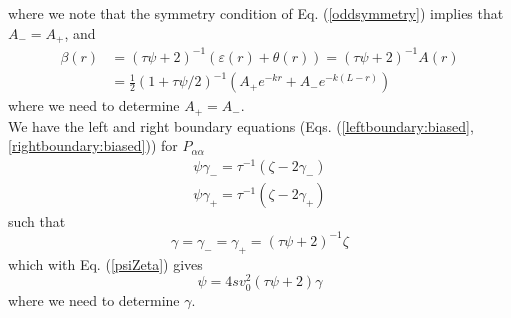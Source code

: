 \documentclass[pre,aps,superscriptaddress,nofootinbib]{revtex4}
\begin{document}
where we note that the symmetry condition of Eq. (\ref{oddsymmetry}) implies that $A_- = A_+$, and
\begin{equation}
\begin{aligned}
\beta(r) &= (\tau\psi + 2)^{-1}(\varepsilon(r) + \theta(r)) = (\tau \psi + 2)^{-1} A(r)\\
&= \frac{1}{2}(1 + \tau\psi/2)^{-1}(A_+ e^{-k r} + A_- e^{-k (L - r)})
\end{aligned}
\label{beta}
\end{equation}
where we need to determine $A_+ = A_-$.\\

We have the left and right boundary equations (Eqs. (\ref{leftboundary:biased}, \ref{rightboundary:biased})) for $P_{\alpha\alpha}$
\begin{eqnarray}
\psi \gamma_- = \tau^{-1} (\zeta - 2 \gamma_-)\\
\psi \gamma_+ = \tau^{-1} (\zeta - 2 \gamma_+)
\end{eqnarray}
such that
\begin{equation}
\gamma = \gamma_- = \gamma_+ = (\tau \psi + 2)^{-1} \zeta
\label{ratio_gamma}
\end{equation}
which with Eq. (\ref{psiZeta}) gives
\begin{equation}
\psi = 4 s v_0^2 (\tau \psi + 2) \gamma
\label{gammaPsi}
\end{equation}
where we need to determine $\gamma$.\\
\end{document}
